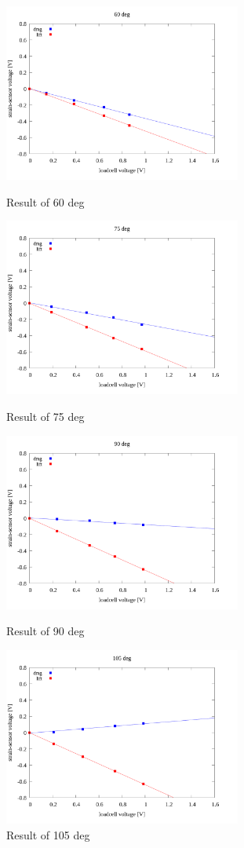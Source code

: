 \documentclass[twocolumn,a4j]{jsarticle}
\begin{document}
\par
\newpage

\begin{figure}[htbp]
    \footnotesize
    \begin{center}
        \includegraphics[width=78mm]{../images/linear/60_linear.png}
        \caption{Result of 60 deg}
        \includegraphics[width=78mm]{../images/linear/75_linear.png}
        \caption{Result of 75 deg}
        \includegraphics[width=78mm]{../images/linear/90_linear.png}
        \caption{Result of 90 deg}
        \includegraphics[width=78mm]{../images/linear/105_linear.png}
        \caption{Result of 105 deg}
    \end{center}
\end{figure}
\end{document}
